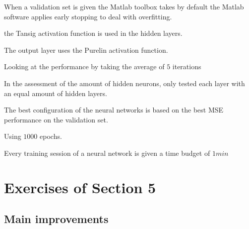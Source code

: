 \documentclass[a4paper,10pt]{article}
\begin{document}
When a validation set is given the Matlab toolbox takes by default the Matlab software applies early stopping to deal with overfitting.

the Tansig activation function is used in the hidden layers. 

The output layer uses the Purelin activation function. 

Looking at the performance by taking the average of $ 5 $ iterations

In the assessment of the amount of hidden neurons, only tested each layer with an equal amount of hidden layers. 


The best configuration of the neural networks is based on the best MSE performance on the validation set. 

Using $ 1000 $ epochs. 

Every training session of a neural network is given a time budget of $ 1 min $

\section{Exercises of Section 5}

\subsection{Main improvements} 






%
\end{document}
